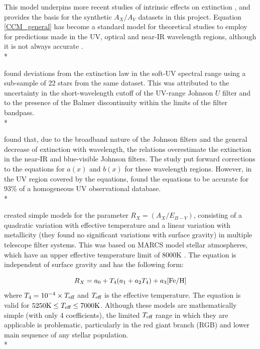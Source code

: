 \documentclass[12pt, a4paper]{report}
\begin{document}
This model underpins more recent studies of intrinsic effects on extinction \citep{2008PASP..120..583G,2014MNRAS.444..392C,2018MNRAS.475.5023C,2018MNRAS.479L.102C}, and provides the basis for the synthetic $A_{X}/A_{V}$ datasets in this project. Equation \ref{CCM_general} has become a standard model for theoretical studies to employ for predictions made in the UV, optical and near-IR wavelength regions, although it is not always accurate \citep{1994ApJ...422..158O,1999PASP..111...63F}. \\*

\cite{1994ApJ...422..158O} found deviations from the \cite{1989ApJ...345..245C} extinction law in the soft-UV spectral range using a sub-sample of 22 stars from the same dataset. This was attributed to the uncertainty in the short-wavelength cutoff of the UV-range Johnson $U$ filter and to the presence of the Balmer discontinuity within the limits of the filter bandpass.\\*

\cite{1999PASP..111...63F} found that, due to the broadband nature of the Johnson filters and the general decrease of extinction with wavelength, the \cite{1989ApJ...345..245C} relations overestimate the extinction in the near-IR and blue-visible Johnson filters. The study put forward corrections to the equations for $a(x)$ and $b(x)$ for these wavelength regions. However, in the UV region covered by the \cite{1989ApJ...345..245C} equations, \cite{2004ApJ...616..912V} found the equations to be accurate for 93\% of a homogeneous UV observational database.\\*

\cite{2014MNRAS.444..392C,2018MNRAS.475.5023C,2018MNRAS.479L.102C} created simple  models for the parameter $R_{X}  = (A_{X}/E_{B-V})$, consisting of a quadratic variation with effective temperature and a linear variation with metallicity (they found no significant variations with surface gravity) in multiple telescope filter systems. This was based on MARCS model stellar atmospheres, which have an upper effective temperature limit of 8000K \citep{2008A&A...486..951G}. The equation is independent of surface gravity and has the following form:

\begin{equation}
R_{X} = a_{0} + T_{4}(a_{1} + a_{2}T_{4}) + a_{3}\textnormal{[Fe/H]}
\label{casagrande_ext_fit}
\end{equation}
where $T_{4} = 10^{-4} \times T_{\textnormal{eff}}$ and $T_{\textnormal{eff}}$ is the effective temperature. The equation is valid for $5250\textnormal{K} \leq T_{\textnormal{eff}} \leq 7000\textnormal{K}$. Although these models are mathematically simple (with only 4 coefficients), the limited $T_{\textnormal{eff}}$ range in which they are applicable is problematic, particularly in the red giant branch (RGB) and lower main sequence of any stellar population.\\*
\end{document}
